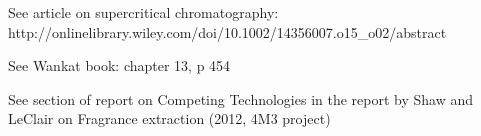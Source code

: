 See article on supercritical chromatography: http://onlinelibrary.wiley.com/doi/10.1002/14356007.o15_o02/abstract

See Wankat book: chapter 13, p 454

See section of report on Competing Technologies in the report by Shaw and LeClair on Fragrance extraction (2012, 4M3 project)